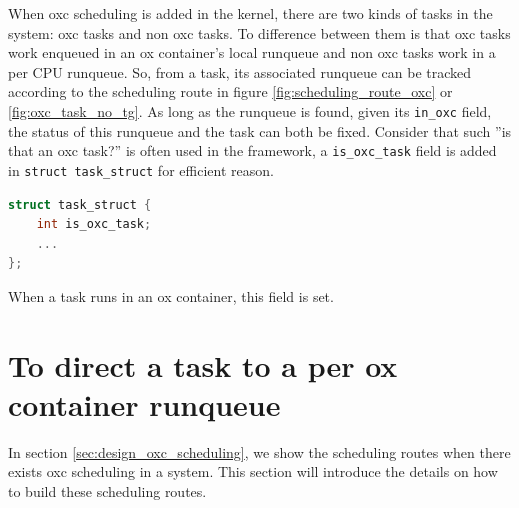 When oxc scheduling is added in the kernel, there are two kinds of tasks
in the system: oxc tasks and non oxc tasks. To difference between them
is that oxc tasks work enqueued in an ox container's local runqueue and 
non oxc tasks work in a per CPU runqueue. So, from a task, its 
associated runqueue can be tracked according to the scheduling route in
figure \ref{fig:scheduling_route_oxc} or \ref{fig:oxc_task_no_tg}.
As long as the runqueue is found, given its \texttt{in\_oxc} field, the 
status of this runqueue and the task can both be fixed.
Consider that such ''is that an oxc task?'' is often used in the framework, 
a \texttt{is\_oxc\_task} field is added in \texttt{struct task\_struct} for 
efficient reason.
\begin{lstlisting}[language=C, caption={\texttt{is\_oxc\_task} field in 
						\texttt{struct task\_struct}}]
struct task_struct {
	int is_oxc_task;
	...
};
\end{lstlisting}
When a task runs in an ox container, this field is set.

\section{To direct a task to a per ox container runqueue}
In section \ref{sec:design_oxc_scheduling}, we show the scheduling routes
when there exists oxc scheduling in a system. This section will introduce
the details on how to build these scheduling routes.
